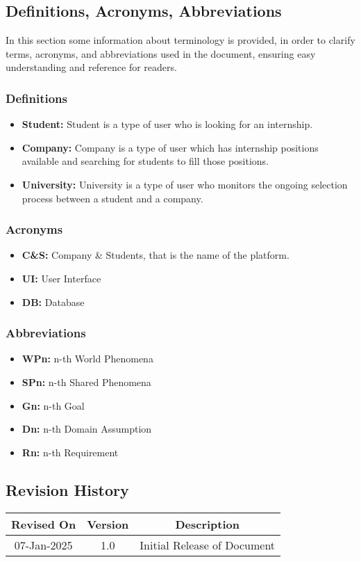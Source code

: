 \subsection{Definitions, Acronyms, Abbreviations}
In this section some information about terminology is provided, in order to clarify terms,
acronyms, and abbreviations used in the document, ensuring easy understanding and reference
for readers.

\subsubsection{Definitions}
\begin{itemize}
    \item \textbf{Student: } Student is a type of user who is looking for an internship.
    \item \textbf{Company: } Company is a type of user which has internship positions available and searching for students to fill those positions.
    \item \textbf{University: } University is a type of user who monitors the ongoing selection process between a student and a company.
\end{itemize}
\subsubsection{Acronyms}
\begin{itemize}
    \item \textbf{C\&S:} Company \& Students, that is the name of the platform.
    \item \textbf{UI:} User Interface
    \item \textbf{DB:} Database

\end{itemize}
\subsubsection{Abbreviations}
\begin{itemize}
\item \textbf{WPn:} n-th World Phenomena
\item \textbf{SPn:} n-th Shared Phenomena
\item \textbf{Gn: } n-th Goal
\item \textbf{Dn: } n-th Domain Assumption
\item \textbf{Rn: } n-th Requirement
\end{itemize}

\subsection{Revision History}
\begin{center}
\begin{tabular}{ | c | c | c | }
 \hline
 Revised On & Version & Description \\
 \hline
 07-Jan-2025 & 1.0 & Initial Release of Document \\
 \hline
\end{tabular}
\end{center}

